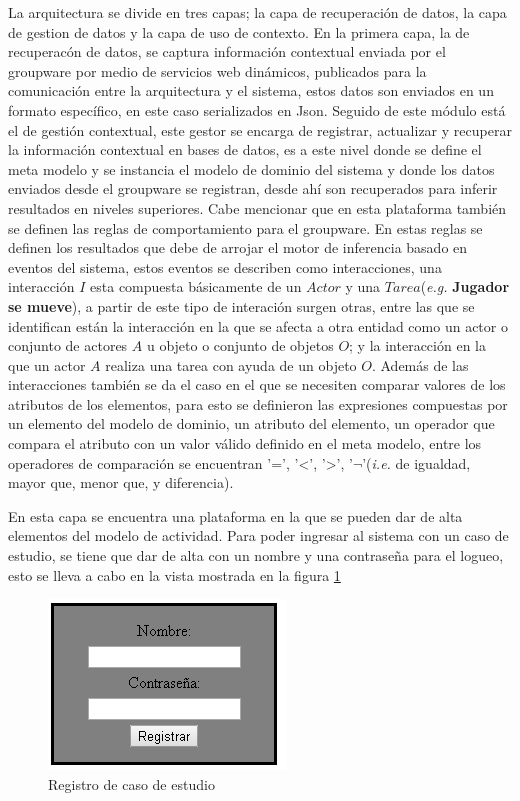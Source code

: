 La arquitectura se divide en tres capas; la capa de recuperaci\'on de datos, la capa de gestion de datos y la capa de uso de contexto. En la primera capa, la de recuperac\'on de datos, se captura informaci\'on contextual enviada por el groupware por medio de servicios web din\'amicos, publicados para la comunicaci\'on entre la arquitectura y el sistema, estos datos son enviados en un formato espec\'ifico, en este caso serializados en Json. Seguido de este m\'odulo est\'a el de gesti\'on contextual, este gestor se encarga de registrar, actualizar y recuperar la informaci\'on contextual en bases de datos, es a este nivel donde se define el meta modelo y  se instancia el modelo de dominio del sistema y donde los datos enviados desde el groupware se registran, desde ahí son recuperados para inferir resultados en niveles superiores. Cabe mencionar que en esta plataforma tambi\'en se definen las reglas de comportamiento para el groupware. En estas reglas se definen los resultados que debe de arrojar el motor de inferencia basado en eventos del sistema, estos eventos se describen como interacciones, una interacci\'on $I$ esta compuesta b\'asicamente de un $Actor$ y una $Tarea$(\textit{e.g.} \textbf{Jugador se mueve}), a partir de este tipo de interaci\'on surgen otras, entre las que se identifican est\'an la interacci\'on en la que se afecta a otra entidad como un actor o conjunto de actores $A$ u objeto o conjunto de objetos $O$; y la interacci\'on en la que un actor $A$ realiza una tarea con ayuda de un objeto $O$. Adem\'as de las interacciones tambi\'en se da el caso en el que se necesiten comparar valores de los atributos de  los elementos, para esto se definieron las expresiones compuestas por un elemento del modelo de dominio, un atributo del elemento, un operador que compara el atributo con un valor v\'alido definido en el meta modelo, entre los operadores de comparaci\'on se encuentran '=', '\textless', '\textgreater', '$\neg$'(\textit{i.e.} de igualdad, mayor que, menor que, y diferencia).

En esta capa se encuentra una plataforma en la que se pueden dar de alta elementos del modelo de actividad. Para poder ingresar al sistema con un caso de estudio, se tiene que dar de alta con un nombre y una contrase\~na para el logueo, esto se lleva a cabo en la vista mostrada en la figura \ref{Ptf:registro1}

\begin{figure}
\centering
\includegraphics[scale=.8]{images/RegistroProto.png}
\caption{Registro de caso de estudio}
\label{Ptf:registro1}
\end{figure}

